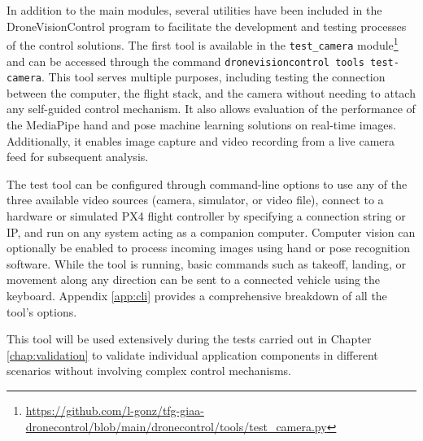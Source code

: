 In addition to the main modules, several utilities have been included in the DroneVisionControl program to facilitate the development and testing processes of the control solutions. The first tool is available in the \texttt{test\_camera} module\footnote{\url{https://github.com/l-gonz/tfg-giaa-dronecontrol/blob/main/dronecontrol/tools/test_camera.py}} and can be accessed through the command \texttt{dronevisioncontrol tools test-camera}. This tool serves multiple purposes, including testing the connection between the computer, the flight stack, and the camera without needing to attach any self-guided control mechanism. It also allows evaluation of the performance of the MediaPipe hand and pose machine learning solutions on real-time images. Additionally, it enables image capture and video recording from a live camera feed for subsequent analysis. 

The test tool can be configured through command-line options to use any of the three available video sources (camera, simulator, or video file), connect to a hardware or simulated PX4 flight controller by specifying a connection string or IP, and run on any system acting as a companion computer. Computer vision can optionally be enabled to process incoming images using hand or pose recognition software. While the tool is running, basic commands such as takeoff, landing, or movement along any direction can be sent to a connected vehicle using the keyboard. Appendix \ref{app:cli} provides a comprehensive breakdown of all the tool's options.

This tool will be used extensively during the tests carried out in Chapter \ref{chap:validation} to validate individual application components in different scenarios without involving complex control mechanisms.
